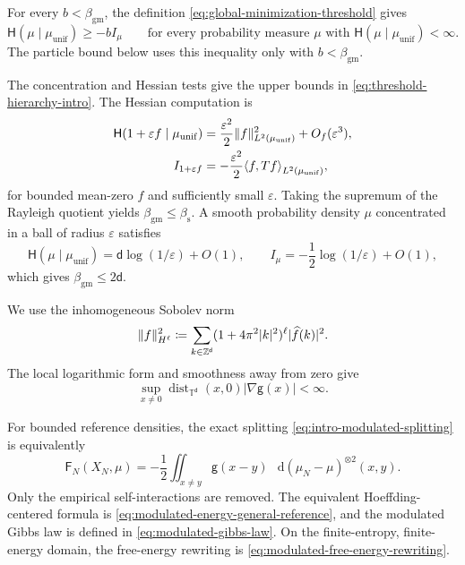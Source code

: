 \documentclass[11pt,reqno]{amsart}
\numberwithin{equation}{section}
\theoremstyle{plain}
\theoremstyle{definition}
\DeclarePairedDelimiter{\norm}{\lVert}{\rVert}
\DeclarePairedDelimiter{\ip}{\langle}{\rangle}
\renewcommand{\d}{\mathsf d}
\newcommand{\dd}{\mathop{}\!\mathrm d}
\newcommand{\T}{\mathbb T}
\newcommand{\Z}{\mathbb Z}
\newcommand{\vep}{\varepsilon}
\newcommand{\g}{\mathsf g}
\newcommand{\Fr}{\mathsf F}
\newcommand{\Hr}{\mathsf H}
\newcommand{\wh}{\widehat}
\newcommand{\muunif}{\mu_{\mathrm{unif}}}
\newcommand{\gm}{\mathrm{gm}}
\newcommand{\spec}{\mathrm{s}}
\newcommand{\XN}{X_N}
\begin{document}
For every $b<\beta_{\gm}$, the definition \eqref{eq:global-minimization-threshold} gives
\begin{equation}
 \Hr(\mu\mid\muunif)\geq-bI_{\mu}
 \qquad\text{for every probability measure $\mu$ with $\Hr(\mu\mid\muunif)<\infty$}.
 \label{eq:strict-subcritical-macroscopic-inequality}
\end{equation}
The particle bound below uses this inequality only with $b<\beta_{\gm}$.

The concentration and Hessian tests give the upper bounds in \eqref{eq:threshold-hierarchy-intro}.  The Hessian computation is
\begin{align}
 \Hr(1+\vep f\mid\muunif)
 &=\frac{\vep^2}{2}\norm{f}_{L^2(\muunif)}^2+O_f(\vep^3),
 \label{eq:entropy-second-variation}\\
 I_{1+\vep f}
 &=-\frac{\vep^2}{2}\ip*{f,Tf}_{L^2(\muunif)},
 \label{eq:energy-second-variation}
\end{align}
for bounded mean-zero $f$ and sufficiently small $\vep$.  Taking the supremum of the Rayleigh quotient yields $\beta_{\gm}\leq\beta_{\spec}$.  A smooth probability density $\mu$ concentrated in a ball of radius $\vep$ satisfies
\begin{equation}
 \Hr(\mu\mid\muunif)=\d\log(1/\vep)+O(1),
 \qquad
 I_{\mu}=-\frac12\log(1/\vep)+O(1),
 \label{eq:concentration-threshold-test}
\end{equation}
which gives $\beta_{\gm}\leq2\d$.


We use the inhomogeneous Sobolev norm
\begin{equation}
 \norm f_{H^\ell}^2\coloneqq\sum_{k\in\Z^{\d}}
 (1+4\pi^2|k|^2)^\ell|\wh f(k)|^2.
 \label{eq:sobolev-norm}
\end{equation}
The local logarithmic form and smoothness away from zero give
\begin{equation}
 \sup_{x\neq0}\operatorname{dist}_{\T^{\d}}(x,0)|\nabla\g(x)|<\infty.
 \label{eq:logarithmic-gradient-bound}
\end{equation}


For bounded reference densities, the exact splitting \eqref{eq:intro-modulated-splitting} is equivalently
\begin{equation}
 \Fr_N(\XN,\mu)=-\frac12\iint_{x\neq y}\g(x-y)
 \,\dd(\mu_N-\mu)^{\otimes2}(x,y).
 \label{eq:empirical-modulated-energy}
\end{equation}
Only the empirical self-interactions are removed. The equivalent Hoeffding-centered formula is \eqref{eq:modulated-energy-general-reference}, and the modulated Gibbs law is defined in \eqref{eq:modulated-gibbs-law}. On the finite-entropy, finite-energy domain, the free-energy rewriting is \eqref{eq:modulated-free-energy-rewriting}.
\end{document}
